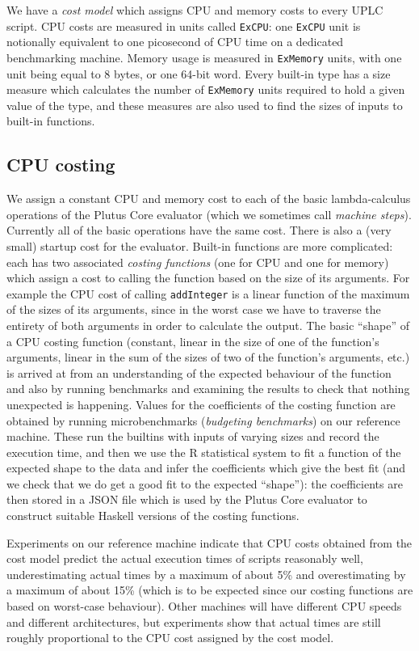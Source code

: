 \documentclass[a4paper]{article}
\begin{document}
We have a \textit{cost model} which assigns CPU and memory costs to every UPLC
script.  CPU costs are measured in units called \texttt{ExCPU}: one
\texttt{ExCPU} unit is notionally equivalent to one picosecond of CPU time on a
dedicated benchmarking machine.  Memory usage is measured in \texttt{ExMemory}
units, with one unit being equal to 8 bytes, or one 64-bit word.  Every built-in
type has a size measure which calculates the number of \texttt{ExMemory} units
required to hold a given value of the type, and these measures are also used to
find the sizes of inputs to built-in functions.

\subsection{CPU costing}  We assign a constant CPU and memory cost to each of
the basic lambda-calculus operations of the Plutus Core evaluator (which we
sometimes call \textit{machine steps}).  Currently all of the basic operations
have the same cost.  There is also a (very small) startup cost for the
evaluator.  Built-in functions are more complicated: each has two associated
\textit{costing functions} (one for CPU and one for memory) which assign a cost
to calling the function based on the size of its arguments.  For example the CPU
cost of calling \texttt{addInteger} is a linear function of the maximum of the
sizes of its arguments, since in the worst case we have to traverse the entirety
of both arguments in order to calculate the output. The basic ``shape'' of a CPU
costing function (constant, linear in the size of one of the function's
arguments, linear in the sum of the sizes of two of the function's arguments,
etc.) is arrived at from an understanding of the expected behaviour of the
function and also by running benchmarks and examining the results to check that
nothing unexpected is happening.  Values for the coefficients of the costing
function are obtained by running microbenchmarks (\textit{budgeting benchmarks})
on our reference machine.  These run the builtins with inputs of varying sizes
and record the execution time, and then we use the R statistical system to fit a
function of the expected shape to the data and infer the coefficients which give
the best fit (and we check that we do get a good fit to the expected ``shape''):
the coefficients are then stored in a JSON file which is used by the Plutus Core
evaluator to construct suitable Haskell versions of the costing functions.

Experiments on our reference machine indicate that CPU costs obtained from the
cost model predict the actual execution times of scripts reasonably well,
underestimating actual times by a maximum of about 5\% and overestimating by a
maximum of about 15\% (which is to be expected since our costing functions are
based on worst-case behaviour).  Other machines will have different CPU speeds
and different architectures, but experiments show that actual times are still
roughly proportional to the CPU cost assigned by the cost model.
\end{document}
